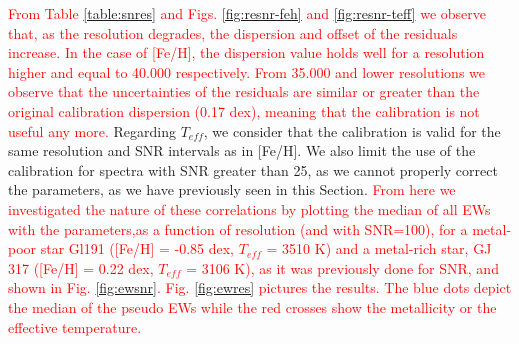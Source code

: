 \documentclass{aa}
\begin{document}
\textcolor{red}{From Table \ref{table:snres} and Figs. \ref{fig:resnr-feh} and \ref{fig:resnr-teff} we observe that, as the resolution degrades, the dispersion and offset of the residuals increase. In the case of [Fe/H], the dispersion value holds well for a resolution higher and equal to 40.000 respectively. From 35.000 and lower resolutions we observe that the uncertainties of the residuals are similar or greater than the original calibration dispersion (0.17 dex), meaning that the calibration is not useful any more.} %
Regarding $T_{eff}$, we consider that the calibration is valid for the same resolution and SNR intervals as in [Fe/H]. We also limit the use of the calibration for spectra with SNR greater than 25, as we cannot properly correct the parameters, as we have previously seen in this Section. %
\textcolor{red}{From here we investigated the nature of these correlations by plotting the median of all EWs with the parameters,as a function of resolution (and with SNR=100), for a metal-poor star Gl191 ([Fe/H] = -0.85 dex, $T_{eff}$ = 3510 K) and a metal-rich star, GJ 317 ([Fe/H] = 0.22 dex, $T_{eff}$ = 3106 K), as it was previously done for SNR, and shown in Fig. \ref{fig:ewsnr}. Fig. \ref{fig:ewres} pictures the results. The blue dots depict the median of the pseudo EWs while the red crosses show the metallicity or the effective temperature. }
\end{document}
